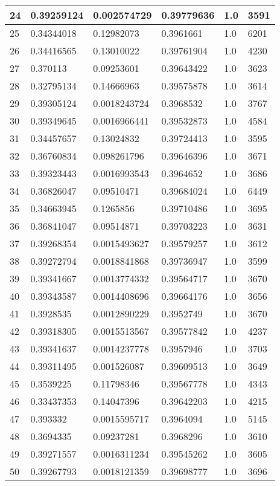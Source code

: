 \begin{longtable}{|l|l|l|l|l|l|}
24 & 0.39259124 & 0.002574729 & 0.39779636 & 1.0 & 3591 \\ \hline 
25 & 0.34344018 & 0.12982073 & 0.3961661 & 1.0 & 6201 \\ \hline 
26 & 0.34416565 & 0.13010022 & 0.39761904 & 1.0 & 4230 \\ \hline 
27 & 0.370113 & 0.09253601 & 0.39643422 & 1.0 & 3623 \\ \hline 
28 & 0.32795134 & 0.14666963 & 0.39575878 & 1.0 & 3614 \\ \hline 
29 & 0.39305124 & 0.0018243724 & 0.3968532 & 1.0 & 3767 \\ \hline 
30 & 0.39349645 & 0.0016966441 & 0.39532873 & 1.0 & 4584 \\ \hline 
31 & 0.34457657 & 0.13024832 & 0.39724413 & 1.0 & 3595 \\ \hline 
32 & 0.36760834 & 0.098261796 & 0.39646396 & 1.0 & 3671 \\ \hline 
33 & 0.39323443 & 0.0016993543 & 0.3964652 & 1.0 & 3686 \\ \hline 
34 & 0.36826047 & 0.09510471 & 0.39684024 & 1.0 & 6449 \\ \hline 
35 & 0.34663945 & 0.1265856 & 0.39710486 & 1.0 & 3695 \\ \hline 
36 & 0.36841047 & 0.09514871 & 0.39703223 & 1.0 & 3631 \\ \hline 
37 & 0.39268354 & 0.0015493627 & 0.39579257 & 1.0 & 3612 \\ \hline 
38 & 0.39272794 & 0.0018841868 & 0.39736947 & 1.0 & 3599 \\ \hline 
39 & 0.39341667 & 0.0013774332 & 0.39564717 & 1.0 & 3670 \\ \hline 
40 & 0.39343587 & 0.0014408696 & 0.39664176 & 1.0 & 3656 \\ \hline 
41 & 0.3928535 & 0.0012890229 & 0.3952749 & 1.0 & 3670 \\ \hline 
42 & 0.39318305 & 0.0015513567 & 0.39577842 & 1.0 & 4237 \\ \hline 
43 & 0.39341637 & 0.0014237778 & 0.3957946 & 1.0 & 3703 \\ \hline 
44 & 0.39311495 & 0.001526087 & 0.39609513 & 1.0 & 3649 \\ \hline 
45 & 0.3539225 & 0.11798346 & 0.39567778 & 1.0 & 4343 \\ \hline 
46 & 0.33437353 & 0.14047396 & 0.39642203 & 1.0 & 4215 \\ \hline 
47 & 0.393332 & 0.0015595717 & 0.3964094 & 1.0 & 5145 \\ \hline 
48 & 0.3694335 & 0.09237281 & 0.3968296 & 1.0 & 3610 \\ \hline 
49 & 0.39271557 & 0.0016311234 & 0.39545262 & 1.0 & 3605 \\ \hline 
50 & 0.39267793 & 0.0018121359 & 0.39698777 & 1.0 & 3696 \\ \hline 
\end{longtable}